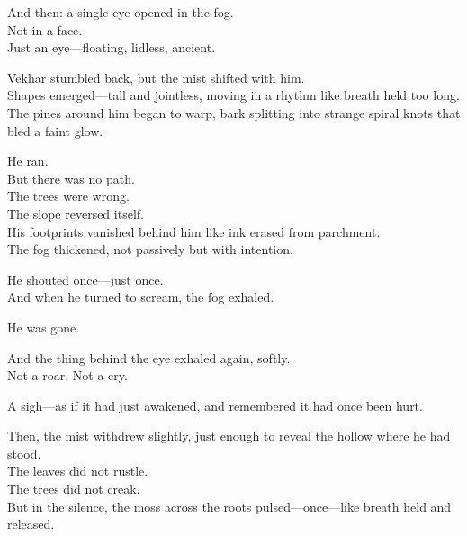 \documentclass[12pt]{article}
\begin{document}
\vspace{1em}

And then: a single eye opened in the fog.\\
Not in a face.\\
Just an eye—floating, lidless, ancient.

\vspace{1em}

Vekhar stumbled back, but the mist shifted with him.\\
Shapes emerged—tall and jointless, moving in a rhythm like breath held too long.\\
The pines around him began to warp, bark splitting into strange spiral knots that bled a faint glow.

\vspace{1em}

He ran.\\
But there was no path.\\
The trees were wrong.\\
The slope reversed itself.\\
His footprints vanished behind him like ink erased from parchment.\\
The fog thickened, not passively but with intention.

\vspace{1em}

He shouted once—just once.\\
And when he turned to scream, the fog exhaled.

\vspace{1em}

He was gone.

\vspace{1em}

And the thing behind the eye exhaled again, softly.\\
Not a roar. Not a cry.

\vspace{1em}

A sigh—as if it had just awakened, and remembered it had once been hurt.

\vspace{1em}

Then, the mist withdrew slightly, just enough to reveal the hollow where he had stood.\\
The leaves did not rustle.\\
The trees did not creak.\\
But in the silence, the moss across the roots pulsed—once—like breath held and released.
\end{document}
